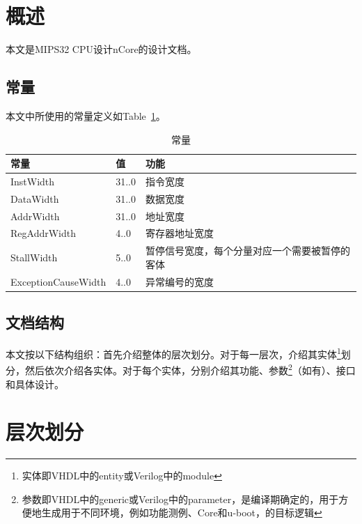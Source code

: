 \documentclass{article}
\begin{document}
\begin{spacing}{1.4}


\section{概述}

本文是MIPS32 CPU设计nCore的设计文档。

\subsection{常量}

本文中所使用的常量定义如Table~\ref{tb:constants}。
\begin{table}[!htb]
\begin{center}
\begin{tabular*}{15cm}{l|l|p{10cm}}  
\hline  
\textbf{常量}&\textbf{值}&\textbf{功能} \\
\hline InstWidth            & 31..0    & 指令宽度 \\
\hline DataWidth            & 31..0    & 数据宽度 \\
\hline AddrWidth            & 31..0    & 地址宽度 \\
\hline RegAddrWidth         & 4..0     & 寄存器地址宽度 \\
\hline StallWidth           & 5..0     & 暂停信号宽度，每个分量对应一个需要被暂停的客体 \\
\hline ExceptionCauseWidth  & 4..0     & 异常编号的宽度 \\
\hline 
\end{tabular*}  
\caption{常量}
\label{tb:constants}
\end{center}
\end{table}

\subsection{文档结构}

本文按以下结构组织：首先介绍整体的层次划分。对于每一层次，介绍其实体\footnote{实体即VHDL中的entity或Verilog中的module}划分，然后依次介绍各实体。对于每个实体，分别介绍其功能、参数\footnote{参数即VHDL中的generic或Verilog中的parameter，是编译期确定的，用于方便地生成用于不同环境，例如功能测例、\textmu Core和u-boot，的目标逻辑}（如有）、接口和具体设计。

\section{层次划分}


\end{spacing}
\end{document}

